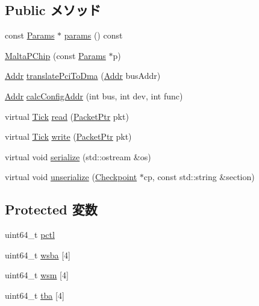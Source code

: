 \subsection*{Public メソッド}
\begin{DoxyCompactItemize}
\item 
const \hyperlink{classMaltaPChip_adcfa4143cf090788abe164c8f54c1a54}{Params} $\ast$ \hyperlink{classMaltaPChip_acd3c3feb78ae7a8f88fe0f110a718dff}{params} () const 
\item 
\hyperlink{classMaltaPChip_aaafe219c17d10c224cc44de6ec4c7866}{MaltaPChip} (const \hyperlink{classMaltaPChip_adcfa4143cf090788abe164c8f54c1a54}{Params} $\ast$p)
\item 
\hyperlink{base_2types_8hh_af1bb03d6a4ee096394a6749f0a169232}{Addr} \hyperlink{classMaltaPChip_a5de3f8c8c47bf4bb58e072f54f4a7cba}{translatePciToDma} (\hyperlink{base_2types_8hh_af1bb03d6a4ee096394a6749f0a169232}{Addr} busAddr)
\item 
\hyperlink{base_2types_8hh_af1bb03d6a4ee096394a6749f0a169232}{Addr} \hyperlink{classMaltaPChip_ac58937201c28a74230a03b39b03066b6}{calcConfigAddr} (int bus, int dev, int func)
\item 
virtual \hyperlink{base_2types_8hh_a5c8ed81b7d238c9083e1037ba6d61643}{Tick} \hyperlink{classMaltaPChip_a613ec7d5e1ec64f8d21fec78ae8e568e}{read} (\hyperlink{classPacket}{PacketPtr} pkt)
\item 
virtual \hyperlink{base_2types_8hh_a5c8ed81b7d238c9083e1037ba6d61643}{Tick} \hyperlink{classMaltaPChip_a4cefab464e72b5dd42c003a0a4341802}{write} (\hyperlink{classPacket}{PacketPtr} pkt)
\item 
virtual void \hyperlink{classMaltaPChip_a53e036786d17361be4c7320d39c99b84}{serialize} (std::ostream \&os)
\item 
virtual void \hyperlink{classMaltaPChip_af22e5d6d660b97db37003ac61ac4ee49}{unserialize} (\hyperlink{classCheckpoint}{Checkpoint} $\ast$cp, const std::string \&section)
\end{DoxyCompactItemize}
\subsection*{Protected 変数}
\begin{DoxyCompactItemize}
\item 
uint64\_\-t \hyperlink{classMaltaPChip_a8df2c098b72e9eee77a79290c8e4a6c5}{pctl}
\item 
uint64\_\-t \hyperlink{classMaltaPChip_a8281ba8e4694bf75ec8b8b5d4d4ad50f}{wsba} \mbox{[}4\mbox{]}
\item 
uint64\_\-t \hyperlink{classMaltaPChip_a16d1e04d18db960e6c8059d404989395}{wsm} \mbox{[}4\mbox{]}
\item 
uint64\_\-t \hyperlink{classMaltaPChip_ad35698b8e7094fe0888d00cad38965ec}{tba} \mbox{[}4\mbox{]}
\end{DoxyCompactItemize}
